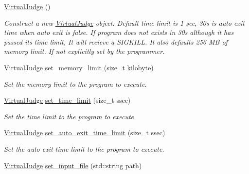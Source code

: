 \begin{DoxyCompactItemize}
\item 
\mbox{\label{classtestcaser_1_1integrator_1_1VirtualJudge_a10b68744cc523bcc8abe1ddca7a281dc}} 
\hyperlink{classtestcaser_1_1integrator_1_1VirtualJudge_a10b68744cc523bcc8abe1ddca7a281dc}{Virtual\+Judge} ()
\begin{DoxyCompactList}\small\item\em Construct a new \hyperlink{classtestcaser_1_1integrator_1_1VirtualJudge}{Virtual\+Judge} object. Default time limit is 1 sec, 30s is auto exit time when auto exit is false. If program does not exists in 30s although it has passed its time limit, It will recieve a S\+I\+G\+K\+I\+LL. It also defaults 256 MB of memory limit. If not explicitly set by the programmer. \end{DoxyCompactList}\item 
\hyperlink{classtestcaser_1_1integrator_1_1VirtualJudge}{Virtual\+Judge} \hyperlink{classtestcaser_1_1integrator_1_1VirtualJudge_a8ac8e323d9f69fb4e1f6ee2e9aa1ae9f}{set\+\_\+memory\+\_\+limit} (size\+\_\+t kilobyte)
\begin{DoxyCompactList}\small\item\em Set the memory limit to the program to execute. \end{DoxyCompactList}\item 
\hyperlink{classtestcaser_1_1integrator_1_1VirtualJudge}{Virtual\+Judge} \hyperlink{classtestcaser_1_1integrator_1_1VirtualJudge_a121272932bb115881ad90be79ad7d0a7}{set\+\_\+time\+\_\+limit} (size\+\_\+t ssec)
\begin{DoxyCompactList}\small\item\em Set the time limit to the program to execute. \end{DoxyCompactList}\item 
\hyperlink{classtestcaser_1_1integrator_1_1VirtualJudge}{Virtual\+Judge} \hyperlink{classtestcaser_1_1integrator_1_1VirtualJudge_ac739270769d85fd09ae35aa53726f8f4}{set\+\_\+auto\+\_\+exit\+\_\+time\+\_\+limit} (size\+\_\+t ssec)
\begin{DoxyCompactList}\small\item\em Set the auto exit time limit to the program to execute. \end{DoxyCompactList}\item 
\hyperlink{classtestcaser_1_1integrator_1_1VirtualJudge}{Virtual\+Judge} \hyperlink{classtestcaser_1_1integrator_1_1VirtualJudge_ad982d30de1a2f9033cb042313d748292}{set\+\_\+input\+\_\+file} (std\+::string path)

\end{DoxyCompactItemize}
